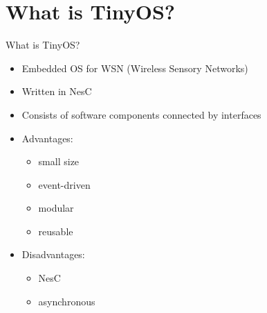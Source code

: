 \section{What is TinyOS?}
    
    \begin{frame}{What is TinyOS?}
        \begin{itemize}
            \item Embedded OS for WSN (Wireless Sensory Networks)
            \item Written in NesC
            \item Consists of software components connected by interfaces
            \item Advantages:
                    \begin{itemize}
                        \item small size
                        \item event-driven
                        \item modular
                        \item reusable
                    \end{itemize}
            \item Disadvantages:
                \begin{itemize}
                    \item NesC
                    \item asynchronous
                \end{itemize}
        \end{itemize}
        
        
    \end{frame}
    